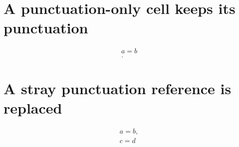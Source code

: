 \documentclass{article}
\begin{document}
\section{A punctuation-only cell keeps its punctuation}
\[\begin{gathered} a=b\\ .\end{gathered}\]

\section{A stray punctuation reference is replaced}
\[\begin{gathered} a=b,\\ c=d\end{gathered}\]
\end{document}
